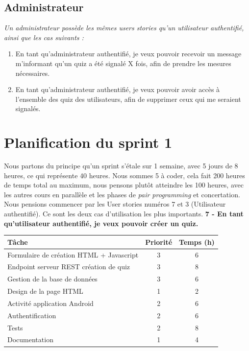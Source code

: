 \documentclass[a4paper, 12pt]{article}
\begin{document}
\subsection{Administrateur}
\textit{Un administrateur possède les mêmes users stories qu'un utilisateur authentifié, ainsi que les cas suivants :}
\begin{enumerate}
    \item En tant qu'administrateur authentifié, je veux pouvoir recevoir un message m'informant qu'un quiz a été signalé X fois, afin de prendre les mesures nécessaires.
    \item En tant qu'administrateur authentifié, je veux pouvoir avoir accès à l'ensemble des quiz des utilisateurs, afin de supprimer ceux qui me seraient signalés.
\end{enumerate}

\section{Planification du sprint 1}
Nous partons du principe qu'un sprint s'étale sur 1 semaine, avec 5 jours de 8 heures, ce qui représente 
40 heures. Nous sommes 5 à coder, cela fait 200 heures de temps total au maximum, nous pensons plutôt atteindre les 100 heures, 
avec les autres cours en parallèle et les phases de \textit{pair programming} et concertation. Nous pensions commencer par les 
User stories numéros 7 et 3 (Utilisateur authentifié). Ce sont les deux cas d'utilisation les plus importants.
\bigbreak
\textbf{7 - En tant qu'utilisateur authentifié, je veux pouvoir créer un quiz.}
\bigbreak
\begin{tabular}{|p{.6\linewidth}|c|c|} \hline
	\textbf{Tâche} & \textbf{Priorité} & \textbf{Temps (h)} \\ \hline
	Formulaire de création HTML + Javascript & 3 & 6 \\ \hline
	Endpoint serveur REST création de quiz & 3 & 8 \\ \hline
	Gestion de la base de données & 3 & 6 \\ \hline
	Design de la page HTML & 1 & 2 \\ \hline
	Activité application Android & 2 & 6 \\ \hline
    Authentification & 2 & 6 \\ \hline
    Tests & 2 & 8 \\ \hline
    Documentation & 1 & 4 \\ \hline
\end{tabular}
\end{document}
